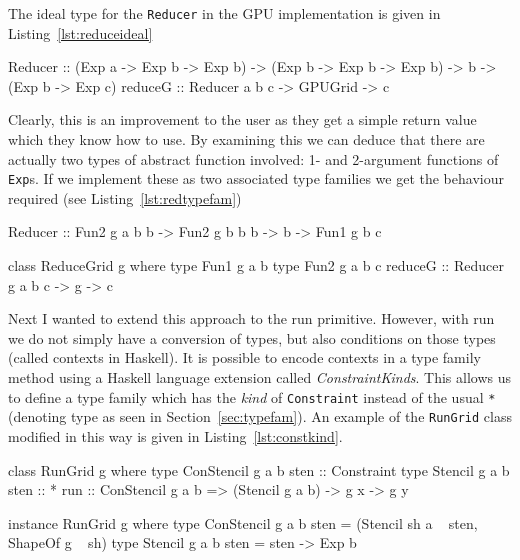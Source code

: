 \documentclass[12pt,a4paper,twoside]{scrbook}
\begin{document}
The ideal type for the \texttt{Reducer} in the GPU implementation is given in
Listing~\ref{lst:reduceideal}

\begin{hflisting}[label={lst:reduceideal}, caption={The optimal type for the
    reduce primitive under Accelerate.}]
Reducer :: (Exp a -> Exp b -> Exp b)
        -> (Exp b -> Exp b -> Exp b)
        -> b
        -> (Exp b -> Exp c)
reduceG :: Reducer a b c -> GPUGrid -> c
\end{hflisting}

Clearly, this is an improvement to the user as they get a simple return value
which they know how to use. By examining this we can deduce that there are
actually two types of abstract function involved: 1- and 2-argument functions of
\texttt{Exp}s. If we implement these as two associated type families we get the
behaviour required (see Listing~\ref{lst:redtypefam})

\begin{hflisting}[label={lst:redtypefam}, caption={The application of type
    families to the reduce primitive.}]
Reducer :: Fun2 g a b b
        -> Fun2 g b b b
        -> b
        -> Fun1 g b c

class ReduceGrid g where
    type Fun1 g a b
    type Fun2 g a b c
    reduceG :: Reducer g a b c -> g -> c
\end{hflisting}

Next I wanted to extend this approach to the run primitive. However, with run we
do not simply have a conversion of types, but also conditions on those types
(called contexts in Haskell). It is possible to encode contexts in a type family
method using a Haskell language extension called \emph{ConstraintKinds}. This
allows us to define a type family which has the \emph{kind} of
\texttt{Constraint} instead of the usual \texttt{*} (denoting type as seen in
Section~\ref{sec:typefam}). An example of the \texttt{RunGrid} class modified in
this way is given in Listing~\ref{lst:constkind}.

\begin{hflisting}[label={lst:constkind}, caption={The application of type
    families to the run primitive.}]
class RunGrid g where
    type ConStencil g a b sten :: Constraint
    type Stencil g a b sten :: *
    run :: ConStencil g a b => (Stencil g a b) -> g x -> g y

instance RunGrid g where
    type ConStencil g a b sten = (Stencil sh a ~ sten, ShapeOf g ~ sh)
    type Stencil g a b sten = sten -> Exp b
\end{hflisting}
\end{document}
